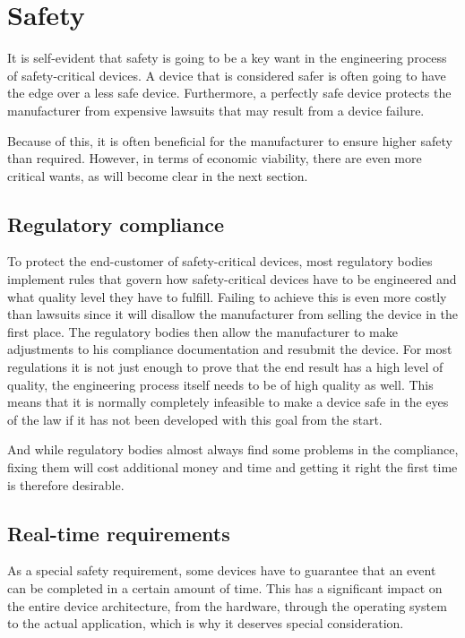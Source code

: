 \section{Safety}
It is self-evident that safety is going to be a key want in the engineering process of safety-critical devices. A device that is considered safer is often going to have the edge over a less safe device. Furthermore, a perfectly safe device protects the manufacturer from expensive lawsuits that may result from a device failure.

Because of this, it is often beneficial for the manufacturer to ensure higher safety than required. However, in terms of economic viability, there are even more critical wants, as will become clear in the next section.

\subsection{Regulatory compliance}
To protect the end-customer of safety-critical devices, most regulatory bodies implement rules that govern how safety-critical devices have to be engineered and what quality level they have to fulfill.
Failing to achieve this is even more costly than lawsuits since it will disallow the manufacturer from selling the device in the first place. The regulatory bodies then allow the manufacturer to make adjustments to his compliance documentation and resubmit the device. For most regulations it is not just enough to prove that the end result has a high level of quality, the engineering process itself needs to be of high quality as well. This means that it is normally completely infeasible to make a device safe in the eyes of the law if it has not been developed with this goal from the start. 

And while regulatory bodies almost always find some problems in the compliance, fixing them will cost additional money and time and getting it right the first time is therefore desirable.

\subsection{Real-time requirements}
As a special safety requirement, some devices have to guarantee that an event can be completed in a certain amount of time. This has a significant impact on the entire device architecture, from the hardware, through the operating system to the actual application, which is why it deserves special consideration.

